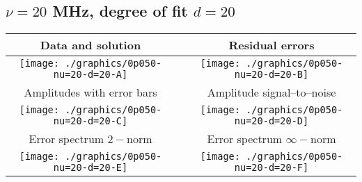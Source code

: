 

% 

\clearpage{}
\break{}

\subsection{$\nu = 20$ MHz, degree of fit $d = 20$}

\begin{table}[h]
    \begin{center}
        \begin{tabular}{ccc}
            Data and solution & \quad & Residual errors \\\hline
            \texttt{[image: ./graphics/0p050-nu=20-d=20-A]} &&
            \texttt{[image: ./graphics/0p050-nu=20-d=20-B]} \\[15pt]
            Amplitudes with error bars && Amplitude signal--to--noise \\\hline
            \texttt{[image: ./graphics/0p050-nu=20-d=20-C]} &&
            \texttt{[image: ./graphics/0p050-nu=20-d=20-D]} \\[15pt]
            Error spectrum $2-$norm && Error spectrum $\infty-$norm \\\hline
            \texttt{[image: ./graphics/0p050-nu=20-d=20-E]} &&
            \texttt{[image: ./graphics/0p050-nu=20-d=20-F]} \\[15pt]
        \end{tabular}
    \end{center}
\label{fig:elev=50, nu=20}
\end{table}



\endinput
